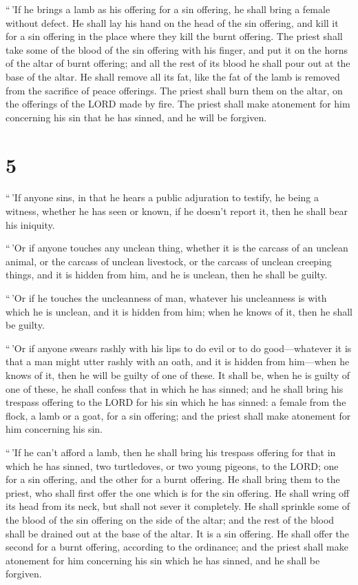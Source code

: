  ``\,'If he brings a lamb as his offering for a sin
offering, he shall bring a female without defect.  He shall
lay his hand on the head of the sin offering, and kill it for a sin
offering in the place where they kill the burnt offering. 
The priest shall take some of the blood of the sin offering with his
finger, and put it on the horns of the altar of burnt offering; and all
the rest of its blood he shall pour out at the base of the altar.
 He shall remove all its fat, like the fat of the lamb is
removed from the sacrifice of peace offerings. The priest shall burn
them on the altar, on the offerings of the LORD made by fire. The priest
shall make atonement for him concerning his sin that he has sinned, and
he will be forgiven.

\hypertarget{section-4}{%
\section{5}\label{section-4}}

 ``\,'If anyone sins, in that he hears a public adjuration
to testify, he being a witness, whether he has seen or known, if he
doesn't report it, then he shall bear his iniquity.

 ``\,'Or if anyone touches any unclean thing, whether it is
the carcass of an unclean animal, or the carcass of unclean livestock,
or the carcass of unclean creeping things, and it is hidden from him,
and he is unclean, then he shall be guilty.

 ``\,'Or if he touches the uncleanness of man, whatever his
uncleanness is with which he is unclean, and it is hidden from him; when
he knows of it, then he shall be guilty.

 ``\,'Or if anyone swears rashly with his lips to do evil or
to do good---whatever it is that a man might utter rashly with an oath,
and it is hidden from him---when he knows of it, then he will be guilty
of one of these.  It shall be, when he is guilty of one of
these, he shall confess that in which he has sinned;  and he
shall bring his trespass offering to the LORD for his sin which he has
sinned: a female from the flock, a lamb or a goat, for a sin offering;
and the priest shall make atonement for him concerning his sin.

 ``\,'If he can't afford a lamb, then he shall bring his
trespass offering for that in which he has sinned, two turtledoves, or
two young pigeons, to the LORD; one for a sin offering, and the other
for a burnt offering.  He shall bring them to the priest,
who shall first offer the one which is for the sin offering. He shall
wring off its head from its neck, but shall not sever it completely.
 He shall sprinkle some of the blood of the sin offering on
the side of the altar; and the rest of the blood shall be drained out at
the base of the altar. It is a sin offering.  He shall
offer the second for a burnt offering, according to the ordinance; and
the priest shall make atonement for him concerning his sin which he has
sinned, and he shall be forgiven.

